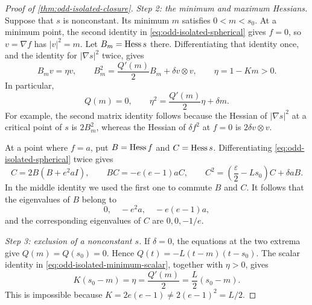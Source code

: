 \begin{proof}[Proof of \cref{thm:odd-isolated-closure}]
\emph{Step 2: the minimum and maximum Hessians.}
Suppose that \(s\) is nonconstant. Its minimum \(m\) satisfies
\(0<m<s_0\). At a minimum point, the second identity in
\eqref{eq:odd-isolated-spherical} gives \(f=0\), so
\(v=\nabla f\) has \(|v|^2=m\). Let \(B_m=\operatorname{Hess} s\) there.
Differentiating that identity once, and the identity for
\(|\nabla s|^2\) twice, gives
\begin{equation}\label{eq:odd-isolated-minimum}
 B_mv=\eta v,\qquad
 B_m^2=\frac{Q'(m)}2B_m+\delta v\otimes v,
 \qquad \eta=1-Km>0.
\end{equation}
In particular,
\begin{equation}\label{eq:odd-isolated-minimum-scalar}
 Q(m)=0,\qquad
 \eta^2=\frac{Q'(m)}2\eta+\delta m.
\end{equation}
For example, the second matrix identity follows because the Hessian
of \(|\nabla s|^2\) at a critical point of \(s\) is \(2B_m^2\),
whereas the Hessian of \(\delta f^2\) at \(f=0\) is
\(2\delta v\otimes v\).

At a point where \(f=a\), put \(B=\operatorname{Hess} f\) and
\(C=\operatorname{Hess} s\). Differentiating
\eqref{eq:odd-isolated-spherical} twice gives
\begin{equation}\label{eq:odd-isolated-maximum}
 C=2B(B+e^2aI),\qquad
 BC=-e(e-1)aC,\qquad
 C^2=\left(\frac\varepsilon2-Ls_0\right)C+\delta aB.
\end{equation}
In the middle identity we used the first one to commute \(B\) and
\(C\). It follows that the eigenvalues of \(B\) belong to
\[
 0,\quad -e^2a,\quad -e(e-1)a,
\]
and the corresponding eigenvalues of \(C\) are
\(0,0,-1/e\).

\emph{Step 3: exclusion of a nonconstant \(s\).}
If \(\delta=0\), the equations at the two extrema give
\(Q(m)=Q(s_0)=0\). Hence \(Q(t)=-L(t-m)(t-s_0)\).
The scalar identity in \eqref{eq:odd-isolated-minimum-scalar},
together with \(\eta>0\), gives
\[
 K(s_0-m)=\eta=\frac{Q'(m)}2=\frac L2(s_0-m).
\]
This is impossible because \(K=2e(e-1)\ne2(e-1)^2=L/2\).


\end{proof}
